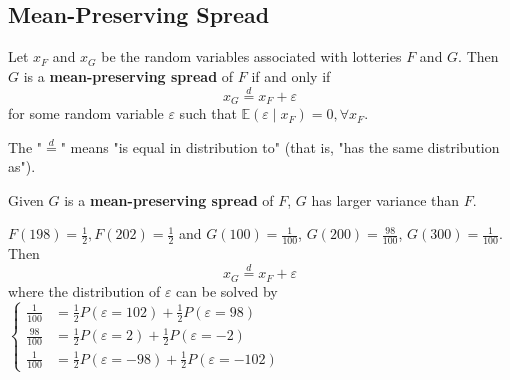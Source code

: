 \documentclass[11pt]{elegantbook}
\begin{document}
\subsection{Mean-Preserving Spread}
\begin{definition}
    \normalfont
    Let $x_F$ and $x_G$ be the random variables associated with lotteries $F$ and $G$. Then $G$ is a \textbf{mean-preserving spread} of $F$ if and only if $$x_G \stackrel{d}{=} x_F+\varepsilon$$
    for some random variable $\varepsilon$ such that $\mathbb{E}(\varepsilon\mid x_F)=0,\forall x_F$.
\end{definition}
The "$\stackrel{d}{=}$" means "is equal in distribution to" (that is, "has the same distribution as").

\begin{note}
    Given $G$ is a \textbf{mean-preserving spread} of $F$, $G$ has larger variance than $F$.
\end{note}

\begin{example}
    $F(198)=\frac{1}{2}, F(202)=\frac{1}{2}$ and $G(100)=\frac{1}{100}$, $G(200)=\frac{98}{100}$, $G(300)=\frac{1}{100}$. Then $$x_G \stackrel{d}{=} x_F+\varepsilon$$
    where the distribution of $\varepsilon$ can be solved by $\left\{\begin{matrix}
        \frac{1}{100}&=\frac{1}{2}P(\varepsilon=102)+\frac{1}{2}P(\varepsilon=98)\\
        \frac{98}{100}&=\frac{1}{2}P(\varepsilon=2)+\frac{1}{2}P(\varepsilon=-2)\\
        \frac{1}{100}&=\frac{1}{2}P(\varepsilon=-98)+\frac{1}{2}P(\varepsilon=-102)
    \end{matrix}\right.$
\end{example}
\end{document}
